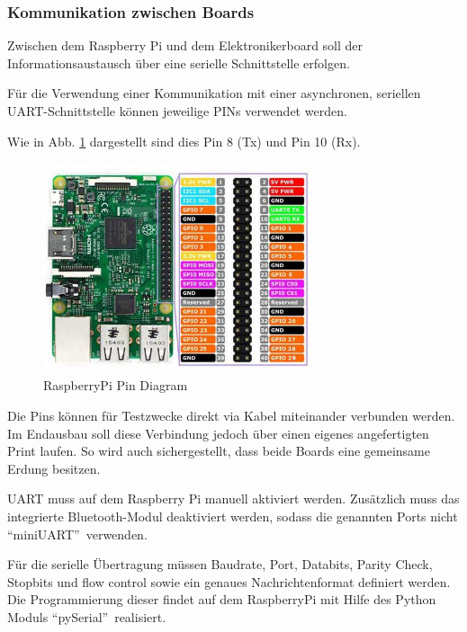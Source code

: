 \documentclass[a4paper]{report}
\begin{document}
\newpage

\subsubsection{Kommunikation zwischen Boards}
\label{ssec:kommunikation}
Zwischen dem Raspberry Pi und dem Elektronikerboard soll der Informationsaustausch über eine serielle Schnittstelle erfolgen.

Für die Verwendung einer Kommunikation mit einer asynchronen, seriellen UART-Schnittstelle können jeweilige PINs verwendet werden.

Wie in Abb. \ref{fig:RaspberryPins} dargestellt sind dies Pin 8 (Tx) und Pin 10 (Rx).
\begin{figure}[h!]
	\centering
	\includegraphics[keepaspectratio, width=0.7\textwidth]{raspberry_pi3_model_b_pin_diagram.jpg}
	\caption{RaspberryPi Pin Diagram}
	\label{fig:RaspberryPins}
\end{figure}

Die Pins können für Testzwecke direkt via Kabel miteinander verbunden werden. Im Endausbau soll diese Verbindung jedoch über einen eigenes angefertigten Print laufen. So wird auch sichergestellt, dass beide Boards eine gemeinsame Erdung besitzen.

UART muss auf dem Raspberry Pi manuell aktiviert werden.  Zusätzlich muss das integrierte Bluetooth-Modul deaktiviert werden, sodass die genannten Ports nicht \textquotedblleft miniUART\textquotedblright\ verwenden.

Für die serielle Übertragung müssen Baudrate, Port, Databits, Parity Check, Stopbits und flow control sowie ein genaues Nachrichtenformat definiert werden. Die Programmierung dieser findet auf dem RaspberryPi mit Hilfe des Python Moduls \textquotedblleft pySerial\textquotedblright\ realisiert.
\end{document}
